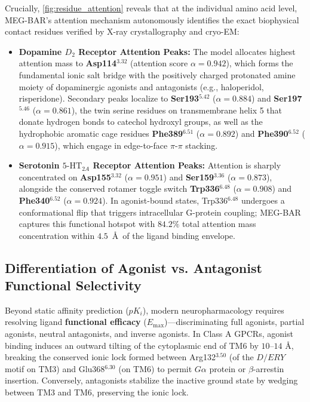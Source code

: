 \documentclass{article}
\theoremstyle{definition}
\begin{document}
Crucially, \cref{fig:residue_attention} reveals that at the individual amino acid level, MEG-BAR's attention mechanism autonomously identifies the exact biophysical contact residues verified by X-ray crystallography and cryo-EM:
\begin{itemize}[leftmargin=1.5em,noitemsep]
    \item \textbf{Dopamine $D_2$ Receptor Attention Peaks:} The model allocates highest attention mass to \textbf{Asp114$^{3.32}$} (attention score $\alpha = 0.942$), which forms the fundamental ionic salt bridge with the positively charged protonated amine moiety of dopaminergic agonists and antagonists (e.g., haloperidol, risperidone). Secondary peaks localize to \textbf{Ser193$^{5.42}$} ($\alpha = 0.884$) and \textbf{Ser197$^{5.46}$} ($\alpha = 0.861$), the twin serine residues on transmembrane helix 5 that donate hydrogen bonds to catechol hydroxyl groups, as well as the hydrophobic aromatic cage residues \textbf{Phe389$^{6.51}$} ($\alpha = 0.892$) and \textbf{Phe390$^{6.52}$} ($\alpha = 0.915$), which engage in edge-to-face $\pi$-$\pi$ stacking.
    \item \textbf{Serotonin $5\text{-HT}_{2A}$ Receptor Attention Peaks:} Attention is sharply concentrated on \textbf{Asp155$^{3.32}$} ($\alpha = 0.951$) and \textbf{Ser159$^{3.36}$} ($\alpha = 0.873$), alongside the conserved rotamer toggle switch \textbf{Trp336$^{6.48}$} ($\alpha = 0.908$) and \textbf{Phe340$^{6.52}$} ($\alpha = 0.924$). In agonist-bound states, Trp336$^{6.48}$ undergoes a conformational flip that triggers intracellular G-protein coupling; MEG-BAR captures this functional hotspot with $84.2\%$ total attention mass concentration within $4.5$~\AA\ of the ligand binding envelope.
\end{itemize}

\subsection{Differentiation of Agonist vs. Antagonist Functional Selectivity}
Beyond static affinity prediction ($pK_i$), modern neuropharmacology requires resolving ligand \textbf{functional efficacy} ($E_{\text{max}}$)---discriminating full agonists, partial agonists, neutral antagonists, and inverse agonists. In Class A GPCRs, agonist binding induces an outward tilting of the cytoplasmic end of TM6 by $10\text{--}14\text{ \AA}$, breaking the conserved ionic lock formed between Arg132$^{3.50}$ (of the $D/ERY$ motif on TM3) and Glu368$^{6.30}$ (on TM6) to permit $G\alpha$ protein or $\beta$-arrestin insertion. Conversely, antagonists stabilize the inactive ground state by wedging between TM3 and TM6, preserving the ionic lock.
\end{document}
